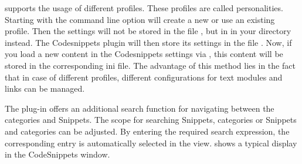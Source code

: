 \codeblocks supports the usage of different profiles. These profiles are called personalities. Starting \codeblocks with the command line option  will create a new or use an existing profile. Then the settings will not be stored in the file , but in  in your  directory instead. The Codesnippets plugin will then store its settings in the file . Now, if you load a new content  in the Codesnippets settings via , this content will be stored in the corresponding ini file. The advantage of this method lies in the fact that in case of different profiles, different configurations for text modules and links can be managed.

The plug-in offers an additional search function for navigating between the categories and Snippets. The scope for searching Snippets, categories or Snippets and categories can be adjusted. By entering the required search expression, the corresponding entry is automatically selected in the view.  shows a typical display in the CodeSnippets window.


